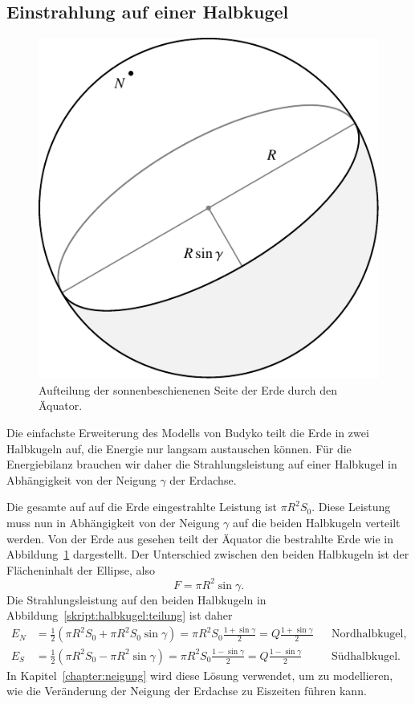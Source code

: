 %
%
%
\subsection{Einstrahlung auf einer Halbkugel\label{subsection:halbkugel}}
\begin{figure}
\centering
\includegraphics{chapters/5/halb.pdf}
\caption{Aufteilung der sonnenbeschienenen Seite der Erde durch den
Äquator.
\label{skript:halbkugel:teilung}}
\end{figure}%
Die einfachste Erweiterung des Modells von Budyko teilt die
Erde in zwei Halbkugeln auf, die Energie nur langsam austauschen
können.
Für die Energiebilanz brauchen wir daher die Strahlungsleistung
auf einer Halbkugel in Abhängigkeit von der Neigung $\gamma$ der
Erdachse.

Die gesamte auf auf die Erde eingestrahlte Leistung ist $\pi R^2S_0$.
Diese Leistung muss nun in Abhängigkeit von der Neigung $\gamma$
auf die beiden Halbkugeln verteilt werden.
Von der Erde aus gesehen teilt der Äquator die bestrahlte Erde wie
in Abbildung~\ref{skript:halbkugel:teilung} dargestellt.
Der Unterschied zwischen den beiden Halbkugeln ist der Flächeninhalt
der Ellipse, also
\[
F=\pi R^2\sin\gamma.
\]
Die Strahlungsleistung auf den beiden Halbkugeln in
Abbildung~\eqref{skript:halbkugel:teilung} ist daher
\begin{align}
E_N
&= 
\frac12(\pi R^2 S_0 +\pi R^2S_0\sin\gamma)
=
\pi R^2S_0 \frac{1+\sin\gamma}2 = Q\frac{1+\sin\gamma}2
&&\text{Nordhalbkugel,}
\\
E_S
&= 
\frac12(\pi R^2 S_0 -\pi R^2\sin\gamma)
=
\pi R^2S_0 \frac{1-\sin\gamma}2 = Q\frac{1-\sin\gamma}2
&&\text{Südhalbkugel.}
\end{align}
In Kapitel~\ref{chapter:neigung} wird diese Lösung verwendet, um zu
modellieren, wie die Veränderung der Neigung der Erdachse zu Eiszeiten
führen kann.




